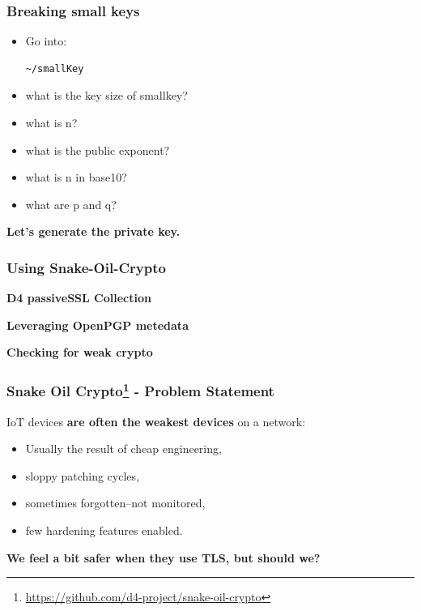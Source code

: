 \documentclass{beamer}
\begin{document}
\begin{frame}[fragile]
  \frametitle{Breaking small keys}
  \begin{itemize}
  \item Go into:

\begin{lstlisting}
~/smallKey
\end{lstlisting}

   \item what is the key size of smallkey?
   \item what is n?
   \item what is the public exponent?
   \item what is n in base10?
   \item what are p and q?
   
  \end{itemize}

  \vspace{8mm}
  {\bf Let's generate the private key.}
  
\end{frame}


\begin{frame}
  \frametitle{Using Snake-Oil-Crypto}
\end{frame}







\begin{frame}
  \begin{center}
    {\bf D4 passiveSSL Collection}
  \end{center}
\end{frame}

\begin{frame}
  \begin{center}
    {\bf Leveraging OpenPGP metedata}
  \end{center}
\end{frame}

\begin{frame}
  \begin{center}
    {\bf Checking for weak crypto}
  \end{center}
\end{frame}

\begin{frame}
  \frametitle{Snake Oil Crypto\footnote{\url{https://github.com/d4-project/snake-oil-crypto}} - Problem Statement}
  IoT devices {\bf are often the weakest devices} on a network:
        \begin{itemize}
        \item Usually the result of cheap engineering,
        \item sloppy patching cycles,
        \item sometimes forgotten--not monitored,
        \item few hardening features enabled.
        \end{itemize}

        \vspace{10 mm} 

{\bf We feel a bit safer when they use TLS, but should we?}

\end{frame}
\end{document}
